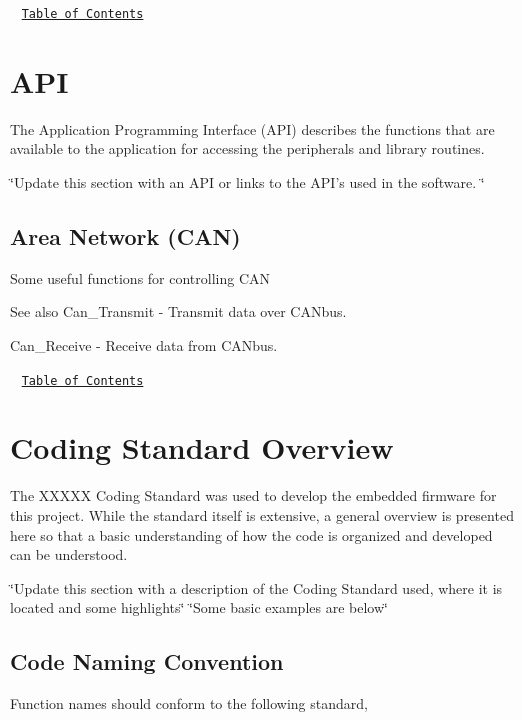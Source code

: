 ~\newline
\href{#Contents}{\tt Table of Contents}~\newline
 



\label{_API}%
\hypertarget{index_API}{}\section{A\+P\+I}\label{index_API}
The Application Programming Interface (A\+P\+I) describes the functions that are available to the application for accessing the peripherals and library routines.

\char`\"{}\+Update this section with an A\+P\+I or links to the A\+P\+I's used in the software.  \char`\"{}\hypertarget{index_Controller}{}\subsection{Area Network (\+C\+A\+N)}\label{index_Controller}
Some useful functions for controlling C\+A\+N \begin{DoxySeeAlso}{See also}
Can\+\_\+\+Transmit -\/ Transmit data over C\+A\+Nbus. ~\newline
 

Can\+\_\+\+Receive -\/ Receive data from C\+A\+Nbus. ~\newline

\end{DoxySeeAlso}
~\newline
\href{#Contents}{\tt Table of Contents}~\newline
 



\label{_CodingStandard}%
\hypertarget{index_Standard}{}\section{Coding Standard Overview}\label{index_Standard}
The X\+X\+X\+X\+X Coding Standard was used to develop the embedded firmware for this project. While the standard itself is extensive, a general overview is presented here so that a basic understanding of how the code is organized and developed can be understood. ~\newline
~\newline


\char`\"{}\+Update this section with a description of the Coding Standard used, where it is located and some highlights\char`\"{} \char`\"{}\+Some basic examples are below\char`\"{}\hypertarget{index_CNC}{}\subsection{Code Naming Convention}\label{index_CNC}
Function names should conform to the following standard, ~\newline

